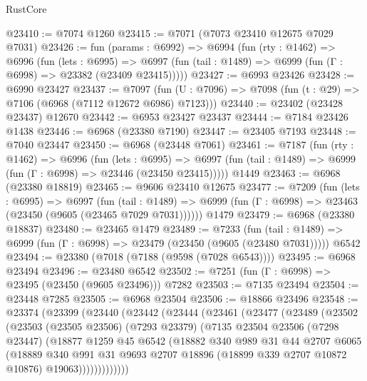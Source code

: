 \begin{lexlean}{RustCore}
\begin{coremodule}
@23410 := @7074 @1260
@23415 := @7071 (@7073 @23410 @12675 @7029 @7031)
@23426 := fun (params : @6992) =>
  @6994
    (fun (rty : @1462) =>
    @6996
      (fun (lets : @6995) =>
      @6997 (fun (tail : @1489) => @6999 (fun (Γ : @6998) => @23382 (@23409 @23415)))))
@23427 := @6993 @23426
@23428 := @6990 @23427
@23437 := @7097
    (fun (U : @7096) => @7098 (fun (t : @29) => @7106 (@6968 (@7112 @12672 @6986) @7123)))
@23440 := @23402 (@23428 @23437) @12670
@23442 := @6953 @23427 @23437
@23444 := @7184 @23426 @1438
@23446 := @6968 (@23380 @7190)
@23447 := @23405 @7193
@23448 := @7040 @23447
@23450 := @6968 (@23448 @7061)
@23461 := @7187
    (fun (rty : @1462) =>
    @6996
      (fun (lets : @6995) =>
      @6997 (fun (tail : @1489) => @6999 (fun (Γ : @6998) => @23446 (@23450 @23415)))))
    @1449
@23463 := @6968 (@23380 @18819)
@23465 := @9606 @23410 @12675
@23477 := @7209
    (fun (lets : @6995) =>
    @6997
      (fun (tail : @1489) =>
      @6999 (fun (Γ : @6998) => @23463 (@23450 (@9605 (@23465 @7029 @7031))))))
    @1479
@23479 := @6968 (@23380 @18837)
@23480 := @23465 @1479
@23489 := @7233
    (fun (tail : @1489) => @6999 (fun (Γ : @6998) => @23479 (@23450 (@9605 (@23480 @7031)))))
    @6542
@23494 := @23380 (@7018 (@7188 (@9598 (@7028 @6543))))
@23495 := @6968 @23494
@23496 := @23480 @6542
@23502 := @7251 (fun (Γ : @6998) => @23495 (@23450 (@9605 @23496))) @7282
@23503 := @7135 @23494
@23504 := @23448 @7285
@23505 := @6968 @23504
@23506 := @18866 @23496
@23548 := @23374
    (@23399
      (@23440
        (@23442
          (@23444
            (@23461
              (@23477
                (@23489
                  (@23502
                    (@23503
                      (@23505 @23506)
                      (@7293 @23379)
                      (@7135
                        @23504
                        @23506
                        (@7298 @23447)
                        (@18877
                          @1259
                          @45
                          @6542
                          (@18882
                            @340
                            @989
                            @31
                            @44
                            @2707
                            @6065
                            (@18889
                              @340
                              @991
                              @31
                              @9693
                              @2707
                              @18896
                              (@18899 @339 @2707 @10872 @10876)
                              @19063)))))))))))))

\end{coremodule}
\end{lexlean}
